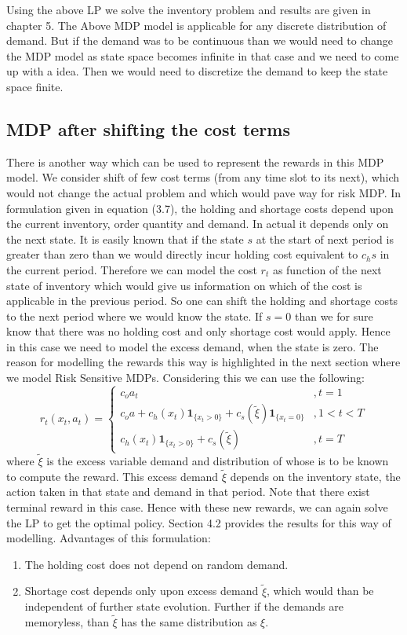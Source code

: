 \documentclass[11pt,a4paper,oneside]{report}
\begin{document}
Using the above LP we solve the inventory problem and results are given in chapter 5. The Above MDP model is  applicable for any discrete distribution of demand. But if the demand was to be continuous than we would need to change the MDP model as state space becomes infinite in that case and we need to come up with a idea. Then we would need to discretize the demand to keep the state space finite. 
\subsection{MDP after shifting the cost terms}
There is another way which can be used to represent the rewards in this MDP model. We consider  shift of few cost terms (from any time slot to its next), which would not change the actual problem and which would pave way for risk MDP. In formulation given in equation (3.7), the holding and shortage costs depend upon the current inventory, order quantity and demand. In actual it depends only on the next state. It is easily known that if the state $s$ at the start of next period is greater than zero than we would directly incur holding cost equivalent to $c_hs$ in the current period. Therefore we can model the cost $r_t$ as function of the next state of inventory which would give us information on which of the cost is applicable in the previous period. So one can shift the holding and shortage costs to the next period where we would know the state. If $s=0$ than we for sure know that there was no holding cost and only shortage cost would apply.
Hence in this case we need to model the excess demand, when the state is zero. The reason for modelling the rewards this way is highlighted in the next section where we model Risk Sensitive MDPs. Considering this we can use the following:\\
\begin{equation}
r_t(x_t,a_t)=
\begin{cases}
c_{o}a_t&,t=1\\
c_{o}a + c_h(x_t)\mathbf{1}_{\lbrace x_t>0\rbrace} + c_s(\tilde{\xi})\mathbf{1}_{\lbrace x_t=0\rbrace}&,1<t< T\\
c_h(x_t)\mathbf{1}_{\lbrace x_t>0\rbrace} + c_s(\tilde{\xi})&,t=T
\end{cases}
\end{equation}
\noindent where $\tilde{\xi}$ is the excess variable demand and distribution of whose is to be known to compute the reward. This excess demand $\tilde{\xi}$ depends on the inventory state, the action taken in that state and demand in that period. Note that there exist terminal reward in this case. Hence with these new rewards, we can again solve the LP to get the optimal policy. Section 4.2 provides the results for this way of modelling. 
Advantages of this formulation:
\begin{enumerate}
\item The holding cost does not depend on random demand.
\item Shortage cost depends only upon excess demand $\tilde\xi$, which would than be independent of further state evolution. Further if the demands are memoryless, than $\tilde{\xi}$ has the same distribution as $\xi$.
\end{enumerate}
\end{document}
